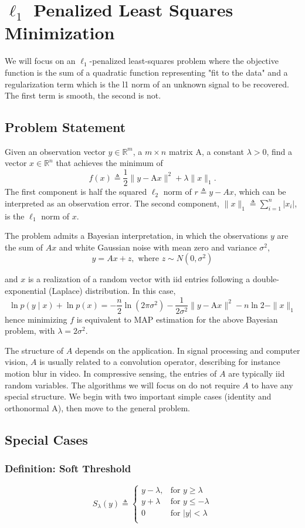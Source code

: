 \documentclass[11pt]{elegantbook}
\begin{document}
\chapter{$\ell_1$ Penalized Least Squares Minimization}
We will focus on an $\ell_1$-penalized least-squares problem where the objective function is the sum of a quadratic function representing "fit to the data" and a regularization term which is the l1 norm of an unknown signal to be recovered. The first term is smooth, the second is not.

\section{Problem Statement}
Given an observation vector $y \in \mathbb{R}^m$, a $m \times n$ matrix $\mathrm{A}$, a constant $\lambda>0$, find a vector $x \in \mathbb{R}^n$ that achieves the minimum of
$$
f(x) \triangleq \frac{1}{2}\|y-\mathrm{A} x\|^2+\lambda\|x\|_1 .
$$
The first component is half the squared $\ell_2$ norm of $r \triangleq y-A x$, which can be interpreted as an observation error. The second component, $\|x\|_1 \triangleq \sum_{i=1}^n\left|x_i\right|$, is the $\ell_1$ norm of $x$.

The problem admits a Bayesian interpretation, in which the observations $y$ are the sum of $A x$ and white Gaussian noise with mean zero and variance $\sigma^2$, $$y=Ax+z,\text{ where }z\sim N(0,\sigma^2)$$

and $x$ is a realization of a random vector with iid entries following a double-exponential (Laplace) distribution. In this case,
$$
\ln p(y \mid x)+\ln p(x)=-\frac{n}{2} \ln \left(2 \pi \sigma^2\right)-\frac{1}{2 \sigma^2}\|y-\mathrm{A} x\|^2-n \ln 2-\|x\|_1
$$
hence minimizing $f$ is equivalent to MAP estimation for the above Bayesian problem, with $\lambda=2 \sigma^2$.

The structure of $A$ depends on the application. In signal processing and computer vision, $A$ is usually related to a convolution operator, describing for instance motion blur in video. In compressive sensing, the entries of $A$ are typically iid random variables. The algorithms we will focus on do not require $A$ to have any special structure. We begin with two important simple cases (identity and orthonormal A), then move to the general problem.

\section{Special Cases}
\subsection{Definition: Soft Threshold}
\begin{definition}
    $$S_\lambda (y)\triangleq\left\{\begin{matrix}
        y-\lambda,&\text{for }y\geq \lambda\\
        y+\lambda&\text{for }y\leq -\lambda\\
        0&\text{for }|y|< \lambda\\
    \end{matrix}\right.$$
\end{definition}
\end{document}
